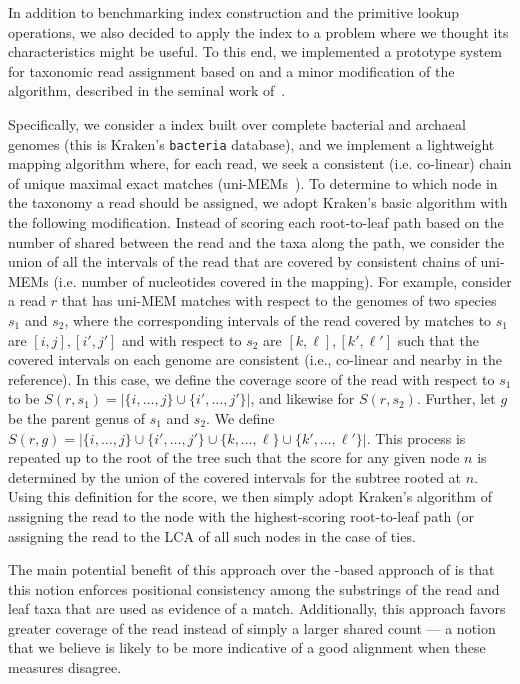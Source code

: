 In addition to benchmarking index construction and the primitive lookup
operations, we also decided to apply the \pufferfish index to a problem where we
thought its characteristics might be useful. To this end, we implemented a
prototype system for taxonomic read assignment based on \pufferfish and a minor
modification of the \kraken algorithm, described in the seminal work
of~\citet{Wood14Kraken}.

Specifically, we consider a \pufferfish index built over complete bacterial and archaeal
genomes (this is Kraken's \texttt{bacteria} database), and we implement a lightweight mapping
algorithm where, for each read, we seek a consistent (i.e. co-linear) chain of
unique maximal exact matches (uni-MEMs~\citep{liu2016debga}). To determine to
which node in the taxonomy a read should be assigned, we adopt Kraken's basic
algorithm with the following modification. Instead of scoring each root-to-leaf
path based on the number of \kmers shared between the read and the taxa along
the path, we consider the union of all the intervals of the read that are covered by consistent
chains of uni-MEMs (i.e. number of nucleotides covered in the mapping).
For example, consider a read $r$ that has uni-MEM matches
with respect to the genomes of two species $s_1$ and $s_2$, where the
corresponding intervals of the read covered by matches to $s_1$ are
$\left[i,j\right], \left[i',j'\right]$ and with respect to $s_2$ are
$\left[k,\ell\right],\left[k',\ell'\right]$ such that the covered intervals on
each genome are consistent (i.e., co-linear and nearby in the reference). In
this case, we define the coverage score of the read with respect to $s_1$ to be
$S(r, s_1) = \left| \{i, \dots, j\} \cup \{i', \dots, j'\}\right|$, and likewise
for $S(r,s_2)$. Further, let $g$ be the parent genus of $s_1$ and $s_2$. We
define $S(r, g) = \left| \{i, \dots, j\} \cup \{i', \dots, j'\} \cup \{k, \dots,
\ell\} \cup \{k', \dots, \ell'\}\right|$. This process is repeated up to the root
of the tree such that the score for any given node $n$ is determined by the
union of the covered intervals for the subtree rooted at $n$.  Using this definition
for the score, we then simply adopt Kraken's algorithm of assigning the read to the
node with the highest-scoring root-to-leaf path (or assigning the read to the LCA
of all such nodes in the case of ties.

The main potential benefit of this approach over the \kmer-based approach of
\kraken is that this notion enforces positional consistency among the substrings
of the read and leaf taxa that are used as evidence of a match. Additionally,
this approach favors greater coverage of the read instead of simply a larger
shared \kmer count --- a notion that we believe is likely to be more indicative
of a good alignment when these measures disagree.

